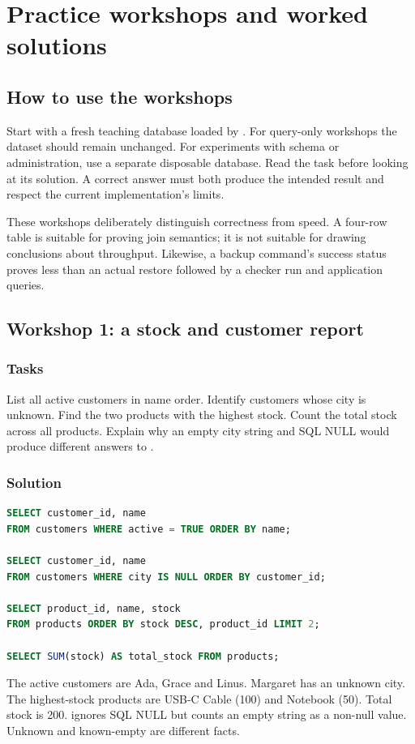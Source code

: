 \chapter{Practice workshops and worked solutions}
\label{learn:workshops}

\section{How to use the workshops}
Start with a fresh teaching database loaded by
. For query-only workshops the dataset
should remain unchanged. For experiments with schema or administration,
use a separate disposable database. Read the task before looking at its
solution. A correct answer must both produce the intended result and respect
the current implementation's limits.

These workshops deliberately distinguish correctness from speed. A four-row
table is suitable for proving join semantics; it is not suitable for drawing
conclusions about throughput. Likewise, a backup command's success status
proves less than an actual restore followed by a checker run and application
queries.

\section{Workshop 1: a stock and customer report}
\subsection{Tasks}
List all active customers in name order. Identify customers whose city is
unknown. Find the two products with the highest stock. Count the total
stock across all products. Explain why an empty city string and SQL NULL
would produce different answers to .

\subsection{Solution}
\begin{lstlisting}[language=SQL]
SELECT customer_id, name
FROM customers WHERE active = TRUE ORDER BY name;

SELECT customer_id, name
FROM customers WHERE city IS NULL ORDER BY customer_id;

SELECT product_id, name, stock
FROM products ORDER BY stock DESC, product_id LIMIT 2;

SELECT SUM(stock) AS total_stock FROM products;
\end{lstlisting}
The active customers are Ada, Grace and Linus. Margaret has an unknown city.
The highest-stock products are USB-C Cable (100) and Notebook (50). Total
stock is 200.  ignores SQL NULL but counts an empty string
as a non-null value. Unknown and known-empty are different facts.

